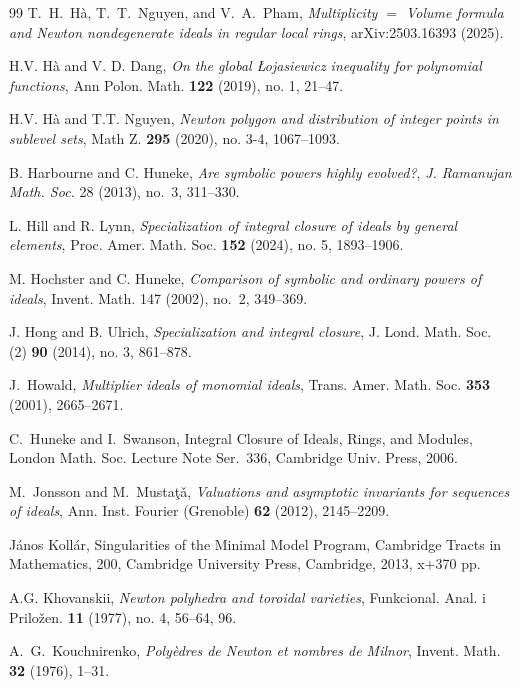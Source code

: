 \documentclass[12pt]{amsart}
\theoremstyle{plain}
\theoremstyle{definition}
\numberwithin{equation}{section}
\begin{document}
\begin{thebibliography}{99}
	T.~H.~H\`a, T.~T.~Nguyen, and V.~A.~Pham,
	\emph{Multiplicity $=$ Volume formula and Newton nondegenerate ideals in regular local rings},
	arXiv:2503.16393 (2025).
	
	H.V. H\`a and V. D. Dang,
	\emph{On the global \L{}ojasiewicz inequality for polynomial functions},
	Ann Polon. Math. \textbf{122} (2019), no. 1, 21--47.
	
	H.V. H\`a and T.T. Nguyen,
	\emph{Newton polygon and distribution of integer points in sublevel sets},
	Math Z. \textbf{295} (2020), no. 3-4, 1067--1093.
	
	B. Harbourne and C. Huneke,
	\emph{Are symbolic powers highly evolved?},
	\emph{J. Ramanujan Math. Soc.} 28 (2013), no.~3, 311--330.

    L. Hill and R. Lynn,
    \emph{Specialization of integral closure of ideals by general elements},
    Proc. Amer. Math. Soc. \textbf{152} (2024), no. 5, 1893--1906.	
    
	M. Hochster and C. Huneke,
	\emph{Comparison of symbolic and ordinary powers of ideals},
	Invent. Math. 147 (2002), no.~2, 349--369.

    J. Hong and B. Ulrich,
    \emph{Specialization and integral closure},
    J. Lond. Math. Soc. (2) \textbf{90} (2014), no. 3, 861--878.
	
	J.~Howald,
	\emph{Multiplier ideals of monomial ideals},
	Trans. Amer. Math. Soc. \textbf{353} (2001), 2665--2671.
	
	C.~Huneke and I.~Swanson,
	Integral Closure of Ideals, Rings, and Modules,
	London Math. Soc. Lecture Note Ser.~336,
	Cambridge Univ. Press, 2006.
	
	M.~Jonsson and M.~Musta\c t\v a,
	\emph{Valuations and asymptotic invariants for sequences of ideals},
	Ann. Inst. Fourier (Grenoble) \textbf{62} (2012), 2145--2209.
	
	J\'anos Koll\'ar,
	Singularities of the Minimal Model Program,
	Cambridge Tracts in Mathematics, 200,
	Cambridge University Press, Cambridge, 2013, x+370 pp.

    A.G. Khovanskii,
    \emph{Newton polyhedra and toroidal varieties},
    Funkcional. Anal. i Priložen. \textbf{11} (1977), no. 4, 56--64, 96.
	
	A.~G.~Kouchnirenko,
	\emph{Poly\`edres de Newton et nombres de Milnor},
	Invent. Math. \textbf{32} (1976), 1--31.
	

\end{thebibliography}
\end{document}
